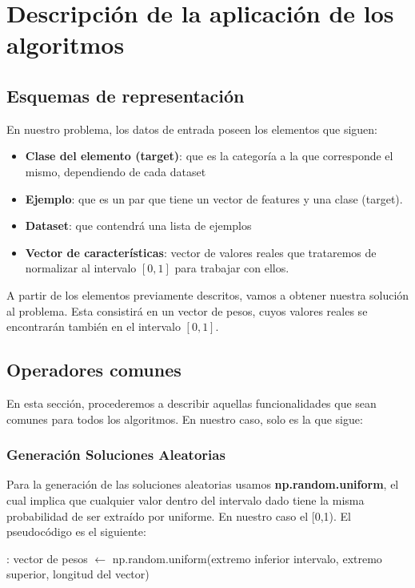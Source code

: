 \documentclass[10pt, a4paper]{article}
\theoremstyle{theorem-style}
\theoremstyle{theorem-style}
\theoremstyle{theorem2-style}
\theoremstyle{definition-style}
\theoremstyle{remark-style}
\theoremstyle{example-style}
\theoremstyle{definition-style}
\theoremstyle{remark-style}
\theoremstyle{remark-style}
\begin{document}
\section{Descripción de la aplicación de los algoritmos}

\subsection{Esquemas de representación}
En nuestro problema, los datos de entrada poseen los elementos que siguen: 
\begin{itemize}	
	\item \textbf{Clase del elemento (target)}: que es la categoría a la que corresponde el mismo, dependiendo de cada dataset
	\item \textbf{Ejemplo}: que es un par que tiene un vector de features y una clase (target).
	\item \textbf{Dataset}: que contendrá una lista de ejemplos
	\item \textbf{Vector de características}: vector de valores reales que trataremos de normalizar al intervalo $[0,1]$ para trabajar con ellos.	

\end{itemize}
A partir de los elementos previamente descritos, vamos a obtener nuestra solución al problema. Esta consistirá en un vector de pesos, cuyos valores reales se encontrarán también en el intervalo $[0,1]$.

\subsection{Operadores comunes}
En esta sección, procederemos a describir aquellas funcionalidades que sean comunes para todos los algoritmos. En nuestro caso, solo es la que sigue: 

\subsubsection{Generación Soluciones Aleatorias}

Para la generación de las soluciones aleatorias usamos \textbf{np.random.uniform}, el cual implica que cualquier valor dentro del intervalo dado tiene la misma probabilidad de ser extraído por uniforme. En nuestro caso el [0,1). El pseudocódigo es el siguiente: \\

\begin{algorithmic}[1]
:
\State vector de pesos $\gets$ np.random.uniform(extremo inferior intervalo, extremo superior, longitud del vector)
\EndProcedure
\end{algorithmic}
\end{document}
